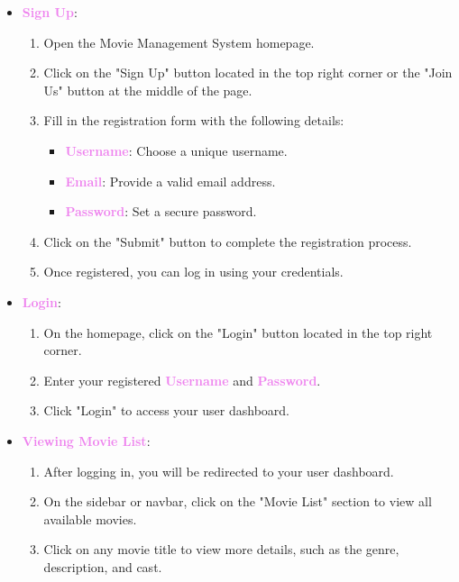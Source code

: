 \documentclass[a4paper,12pt]{article}  %
\renewcommand{\textbf}[1]{\textcolor{violet}{\bfseries #1}}
\begin{document}
\begin{itemize}
    \item \textbf{Sign Up}:
    \begin{enumerate}
        \item Open the Movie Management System homepage.
        \item Click on the "Sign Up" button located in the top right corner or the "Join Us" button at the middle of the page.
        \item Fill in the registration form with the following details:
        \begin{itemize}
            \item \textbf{Username}: Choose a unique username.
            \item \textbf{Email}: Provide a valid email address.
            \item \textbf{Password}: Set a secure password.
        \end{itemize}
        \item Click on the "Submit" button to complete the registration process.
        \item Once registered, you can log in using your credentials.
    \end{enumerate}
    
    \item \textbf{Login}:
    \begin{enumerate}
        \item On the homepage, click on the "Login" button located in the top right corner.
        \item Enter your registered \textbf{Username} and \textbf{Password}.
        \item Click "Login" to access your user dashboard.
    \end{enumerate}

    \item \textbf{Viewing Movie List}:
    \begin{enumerate}
        \item After logging in, you will be redirected to your user dashboard.
        \item On the sidebar or navbar, click on the "Movie List" section to view all available movies.
        \item Click on any movie title to view more details, such as the genre, description, and cast.
    \end{enumerate}


\end{itemize}
\end{document}
